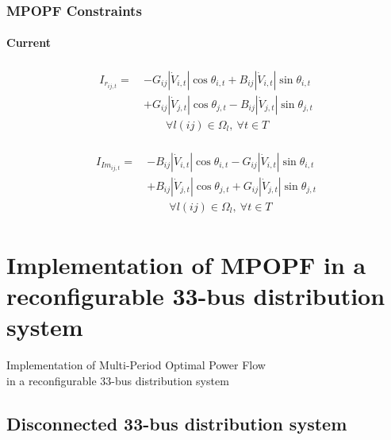 \documentclass[
	11pt, %
	aspectratio=169, %
]{beamer}
\begin{document}
\begin{frame}
	\frametitle{MPOPF Constraints}
	\framesubtitle{Current} %

	\begin{align}
	\label{eq:Mexpr_i_re}
		\begin{split}
			I_{r_{ij,t}} =\ &-G_{ij}\left\lvert \dot{V}_{i,t} \right\rvert \cos{\theta_{i,t}} + B_{ij}\left\lvert \dot{V}_{i,t} \right\rvert \sin{\theta_{i,t}} \\
					&+ G_{ij}\left\lvert \dot{V}_{j,t} \right\rvert \cos{\theta_{j,t}} - B_{ij}\left\lvert \dot{V}_{j,t} \right\rvert \sin{\theta_{j,t}} \\[1em]
			&\qquad \forall l(ij) \in \Omega_{l},\  \forall t \in T
		\end{split}
	\end{align}

	\begin{align}
	\label{eq:Mexpr_i_imag}
		\begin{split}
			I_{Im_{ij,t}} =\ &-B_{ij}\left\lvert \dot{V}_{i,t} \right\rvert \cos{\theta_{i,t}} - G_{ij}\left\lvert \dot{V}_{i,t} \right\rvert \sin{\theta_{i,t}} \\
			&+ B_{ij}\left\lvert \dot{V}_{j,t} \right\rvert \cos{\theta_{j,t}} + G_{ij}\left\lvert \dot{V}_{j,t} \right\rvert \sin{\theta_{j,t}} \\[1em]
			&\qquad \forall l(ij) \in \Omega_{l},\ \forall t \in T
		\end{split}
	\end{align}

\end{frame}
	

\section{Implementation of MPOPF in a reconfigurable 33-bus distribution system}

\begin{frame}
    \centering
    \LARGE
    Implementation of Multi-Period Optimal Power Flow \\ in a reconfigurable 33-bus distribution system
\end{frame}


\subsection{Disconnected 33-bus distribution system}
\end{document}
